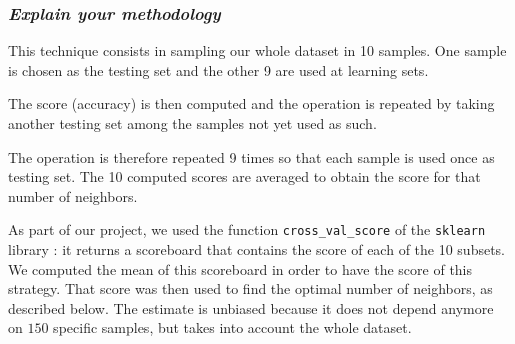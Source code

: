 \subsubsection{{\it Explain your methodology}}
This technique consists in sampling our whole dataset in \num{10} samples. One sample is chosen as the testing set and the other \num{9} are used at learning sets.\par
The score (accuracy) is then computed and the operation is repeated by taking another testing set among the samples not yet used as such.\par
The operation is therefore repeated \num{9} times so that each sample is used once as testing set. The \num{10} computed scores are averaged to obtain the score for that number of neighbors.\par
As part of our project, we used the function \texttt{cross\_val\_score} of the \texttt{sklearn} library : it returns a scoreboard that contains the score of each of the 10 subsets. We computed the mean of this scoreboard in order to have the score of this strategy. That score was then used to find the optimal number of neighbors, as described below. The estimate is unbiased because it does not depend anymore on $150$ specific samples, but takes into account the whole dataset.

